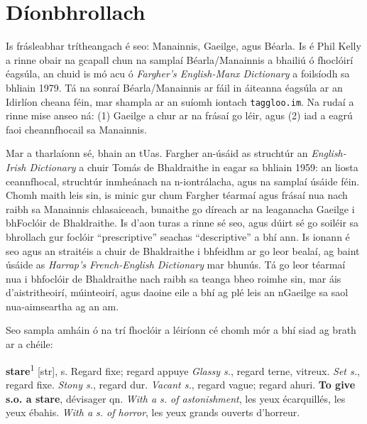 \newpage

\chapter*{Díonbhrollach}

Is frásleabhar trítheangach é seo: Manainnis, Gaeilge, agus Béarla.
Is é Phil Kelly a rinne obair na gcapall chun na samplaí Béarla/Manainnis
a bhailiú ó fhoclóirí éagsúla, an chuid is mó acu ó 
\textit{Fargher's English-Manx Dictionary} a foilsíodh sa bhliain 1979.
Tá na sonraí Béarla/Manainnis ar fáil in áiteanna éagsúla ar an
Idirlíon cheana féin,
mar shampla ar an suíomh iontach \texttt{taggloo.im}.
Na rudaí a rinne mise anseo ná: (1) Gaeilge a chur ar na frásaí go léir, agus 
(2) iad a eagrú faoi cheannfhocail sa Manainnis.

Mar a tharlaíonn sé, bhain an tUas. Fargher an-úsáid as struchtúr an 
\textit{English-Irish Dictionary} a chuir Tomás de Bhaldraithe in eagar
sa bhliain 1959: an liosta ceannfhocal, struchtúr inmheánach na
n-iontrálacha, agus na samplaí úsáide féin.
Chomh maith leis sin,
is minic gur chum Fargher téarmaí agus frásaí nua nach raibh sa Manainnis
chlasaiceach, bunaithe go díreach ar na leaganacha Gaeilge
i bhFoclóir de Bhaldraithe. Is d'aon turas a rinne sé seo, agus dúirt
sé go soiléir sa bhrollach gur foclóir ``prescriptive'' seachas
``descriptive'' a bhí ann.
Is ionann é seo agus an straitéis a chuir de Bhaldraithe i bhfeidhm
ar go leor bealaí, ag baint úsáide as
\textit{Harrap's French-English Dictionary}
mar bhunús. Tá go leor téarmaí nua i bhfoclóir de Bhaldraithe
nach raibh sa teanga bheo roimhe sin, mar áis d'aistritheoirí,
múinteoirí, agus daoine eile a bhí ag plé leis an nGaeilge sa
saol nua-aimseartha ag an am.

Seo sampla amháin ó na trí fhoclóir a léiríonn cé chomh mór a bhí siad
ag brath ar a chéile:

\vspace{1.4ex}

\textbf{stare}\textsuperscript{1} [st\textepsilon\textschwa{}r], s. Regard fixe; regard appuye \textit{Glassy s.}, regard terne, vitreux. \textit{Set s.}, regard fixe. \textit{Stony s.}, regard dur. \textit{Vacant s.}, regard vague; regard ahuri. \textbf{To give s.o. a stare}, dévisager qn. \textit{With a s. of astonishment}, les yeux écarquillés, les yeux ébahis. \textit{With a s. of horror}, les yeux grands ouverts d'horreur.

\vspace{0.8ex}


